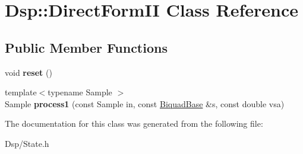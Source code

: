 \hypertarget{classDsp_1_1DirectFormII}{\section{Dsp\-:\-:Direct\-Form\-I\-I Class Reference}
\label{classDsp_1_1DirectFormII}
}
\subsection*{Public Member Functions}
\begin{DoxyCompactItemize}
\item 
\hypertarget{classDsp_1_1DirectFormII_a3c600421f9d9a58b325ff53a7b99b4d4}{void {\bfseries reset} ()}\label{classDsp_1_1DirectFormII_a3c600421f9d9a58b325ff53a7b99b4d4}

\item 
\hypertarget{classDsp_1_1DirectFormII_a1ccd69f084fdf7a192f74029a408cdc7}{{\footnotesize template$<$typename Sample $>$ }\\Sample {\bfseries process1} (const Sample in, const \hyperlink{classDsp_1_1BiquadBase}{Biquad\-Base} \&s, const double vsa)}\label{classDsp_1_1DirectFormII_a1ccd69f084fdf7a192f74029a408cdc7}

\end{DoxyCompactItemize}


The documentation for this class was generated from the following file\-:\begin{DoxyCompactItemize}
\item 
Dsp/State.\-h\end{DoxyCompactItemize}
